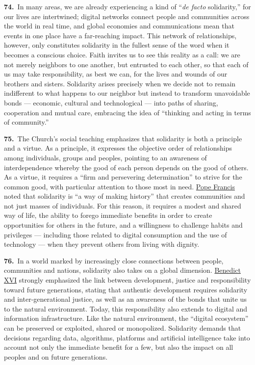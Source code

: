 \documentclass{article}
\begin{document}
\textbf{74.}\ In many areas, we are already experiencing a kind of ``\emph{de facto} solidarity,'' for our lives are intertwined; digital networks connect people and communities across the world in real time, and global economies and communications mean that events in one place have a far-reaching impact. This network of relationships, however, only constitutes solidarity in the fullest sense of the word when it becomes a conscious choice. Faith invites us to see this reality as a call: we are not merely neighbors to one another, but entrusted to each other, so that each of us may take responsibility, as best we can, for the lives and wounds of our brothers and sisters. Solidarity arises precisely when we decide not to remain indifferent to what happens to our neighbor but instead to transform unavoidable bonds --- economic, cultural and technological --- into paths of sharing, cooperation and mutual care, embracing the idea of ``thinking and acting in terms of community.''\cite{n101}

\textbf{75.}\ The Church's social teaching emphasizes that solidarity is both a principle and a virtue. As a principle, it expresses the objective order of relationships among individuals, groups and peoples, pointing to an awareness of interdependence whereby the good of each person depends on the good of others. As a virtue, it requires a ``firm and persevering determination''\cite{n102} to strive for the common good, with particular attention to those most in need. \href{https://www.vatican.va/content/francesco/en.html}{Pope Francis} noted that solidarity is ``a way of making history''\cite{n103} that creates communities and not just masses of individuals. For this reason, it requires a modest and shared way of life, the ability to forego immediate benefits in order to create opportunities for others in the future, and a willingness to challenge habits and privileges --- including those related to digital consumption and the use of technology --- when they prevent others from living with dignity.

\textbf{76.}\ In a world marked by increasingly close connections between people, communities and nations, solidarity also takes on a global dimension. \href{https://www.vatican.va/content/benedict-xvi/en.html}{Benedict XVI} strongly emphasized the link between development, justice and responsibility toward future generations, stating that authentic development requires solidarity and inter-generational justice,\cite{n104} as well as an awareness of the bonds that unite us to the natural environment. Today, this responsibility also extends to digital and information infrastructure. Like the natural environment, the ``digital ecosystem'' can be preserved or exploited, shared or monopolized. Solidarity demands that decisions regarding data, algorithms, platforms and artificial intelligence take into account not only the immediate benefit for a few, but also the impact on all peoples and on future generations.
\end{document}
